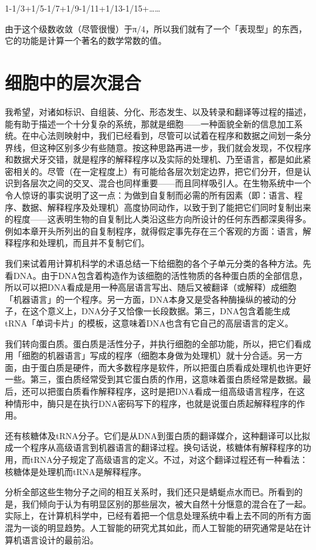\documentclass[
  12pt,
  twoside,
  openright,
  oldfontcommands,
]{memoir}
\begin{document}
1-1/3+1/5-1/7+1/9-1/11+1/13-1/15+\ldots\ldots{}

由于这个级数收敛（尽管很慢）于π/4，所以我们就有了一个「表现型」的东西，它的功能是计算一个著名的数学常数的值。

\section{细胞中的层次混合}

我希望，对诸如标识、自组装、分化、形态发生、以及转录和翻译等过程的描述，能有助于描述一个十分复杂的系统，那就是细胞------一种面貌全新的信息加工系统。在中心法则映射中，我们已经看到，尽管可以试着在程序和数据之间划一条分界线，但这种区别多少有些随意。按这种思路再进一步，我们就会发现，不仅程序和数据犬牙交错，就是程序的解释程序以及实际的处理机、乃至语言，都是如此紧密相关的。尽管（在一定程度上）有可能给各层次划定边界，把它们分开，但是认识到各层次之间的交叉、混合也同样重要------而且同样吸引人。在生物系统中一个令人惊讶的事实说明了这一点：为做到自复制而必需的所有因素（即：语言、程序、数据、解释程序及处理机）高度协同动作，以致于到了能把它们同时复制出来的程度------这表明生物的自复制比人类沿这些方向所设计的任何东西都深奥得多。例如本章开头所列出的自复制程序，就得假定事先存在三个客观的方面：语言，解释程序和处理机，而且并不复制它们。

我们来试着用计算机科学的术语总结一下给细胞的各个子单元分类的各种方法。先看DNA。由于DNA包含着构造作为该细胞的活性物质的各种蛋白质的全部信息，所以可以把DNA看成是用一种高层语言写出、随后又被翻译（或解释）成细胞「机器语言」的一个程序。另一方面，DNA本身又是受各种酶操纵的被动的分子，在这个意义上，DNA分子又恰像一长段数据。第三，DNA包含着能生成tRNA「单词卡片」的模板，这意味着DNA也含有它自己的高层语言的定义。

我们转向蛋白质。蛋白质是活性分子，并执行细胞的全部功能，所以，把它们看成用「细胞的机器语言」写成的程序（细胞本身做为处理机）就十分合适。另一方面，由于蛋白质是硬件，而大多数程序是软件，所以把蛋白质看成处理机也许更好一些。第三，蛋白质经常受到其它蛋白质的作用，这意味着蛋白质经常是数据。最后，还可以把蛋白质看作解释程序，这时是把DNA看成一组高级语言程序，在这种情形中，酶只是在执行DNA密码写下的程序，也就是说蛋白质起解释程序的作用。

还有核糖体及tRNA分子。它们是从DNA到蛋白质的翻译媒介，这种翻译可以比拟成一个程序从高级语言到机器语言的翻译过程。换句话说，核糖体有解释程序的功用，而tRNA分子规定了高级语言的定义。不过，对这个翻译过程还有一种看法：核糖体是处理机而tRNA是解释程序。

分析全部这些生物分子之间的相互关系时，我们还只是蜻蜓点水而已。所看到的是，我们倾向于认为有明显区别的那些层次，被大自然十分惬意的混合在了一起。实际上，在计算机科学中，已经有着把一个信息处理系统中看上去不同的所有方面混为一谈的明显趋势。人工智能的研究尤其如此，而人工智能的研究通常是站在计算机语言设计的最前沿。
\end{document}
